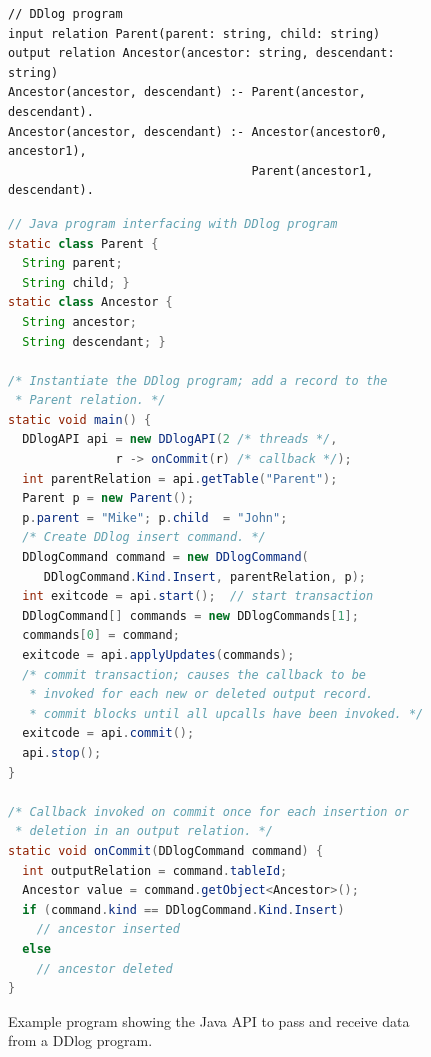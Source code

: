 \begin{figure}
  \footnotesize
  \begin{lstlisting}[language=ddlog]
// DDlog program    
input relation Parent(parent: string, child: string)
output relation Ancestor(ancestor: string, descendant: string)
Ancestor(ancestor, descendant) :- Parent(ancestor, descendant).
Ancestor(ancestor, descendant) :- Ancestor(ancestor0, ancestor1),
                                  Parent(ancestor1, descendant).
  \end{lstlisting}
  
  \begin{lstlisting}[language=Java]
// Java program interfacing with DDlog program    
static class Parent {
  String parent;
  String child; }
static class Ancestor {
  String ancestor;
  String descendant; }

/* Instantiate the DDlog program; add a record to the
 * Parent relation. */
static void main() {
  DDlogAPI api = new DDlogAPI(2 /* threads */,
               r -> onCommit(r) /* callback */);
  int parentRelation = api.getTable("Parent");
  Parent p = new Parent();
  p.parent = "Mike"; p.child  = "John";
  /* Create DDlog insert command. */
  DDlogCommand command = new DDlogCommand(
     DDlogCommand.Kind.Insert, parentRelation, p);
  int exitcode = api.start();  // start transaction
  DDlogCommand[] commands = new DDlogCommands[1];
  commands[0] = command;
  exitcode = api.applyUpdates(commands);
  /* commit transaction; causes the callback to be 
   * invoked for each new or deleted output record.
   * commit blocks until all upcalls have been invoked. */
  exitcode = api.commit();
  api.stop();
}

/* Callback invoked on commit once for each insertion or
 * deletion in an output relation. */
static void onCommit(DDlogCommand command) {
  int outputRelation = command.tableId;
  Ancestor value = command.getObject<Ancestor>();
  if (command.kind == DDlogCommand.Kind.Insert) 
    // ancestor inserted
  else 
    // ancestor deleted
}
\end{lstlisting}
\caption{Example program showing the Java API to pass and receive data
  from a DDlog program.\label{fig:javaapi}}
\end{figure}

